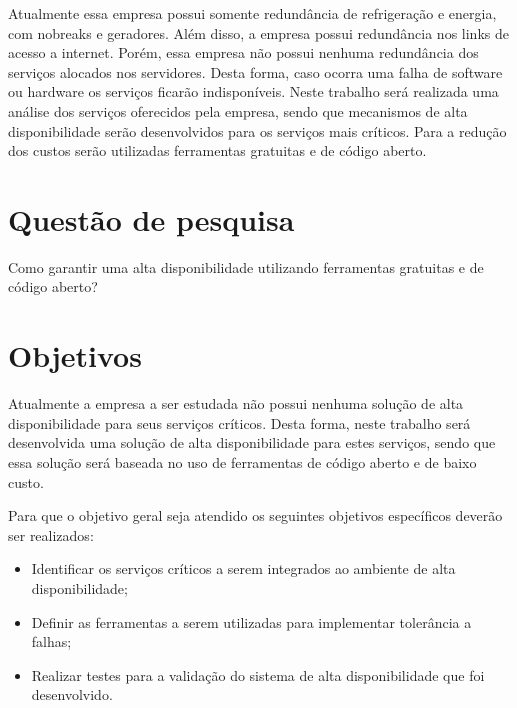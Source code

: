 Atualmente essa empresa possui somente redundância de refrigeração e energia, com nobreaks e geradores. Além disso, a empresa possui redundância nos links de acesso a internet. Porém, essa empresa não possui nenhuma redundância dos serviços alocados nos servidores. Desta forma, caso ocorra uma falha de software ou hardware os serviços ficarão indisponíveis. Neste trabalho será realizada uma análise dos serviços oferecidos pela empresa, sendo que mecanismos de alta disponibilidade serão desenvolvidos para os serviços mais críticos. Para a redução dos custos serão utilizadas ferramentas gratuitas e de código aberto.

\section{Questão de pesquisa}
Como garantir uma alta disponibilidade utilizando ferramentas gratuitas e de código aberto?

\section{Objetivos}
Atualmente a empresa a ser estudada não possui nenhuma solução de alta disponibilidade para seus serviços críticos. Desta forma, neste trabalho será desenvolvida uma solução de alta disponibilidade para estes serviços, sendo que essa solução será baseada no uso de ferramentas de código aberto e de baixo custo.

Para que o objetivo geral seja atendido os seguintes objetivos específicos deverão ser realizados:

\begin{itemize}
\item Identificar os serviços críticos a serem integrados ao ambiente de alta disponibilidade;
\item Definir as ferramentas a serem utilizadas para implementar tolerância a falhas;
\item Realizar testes para a validação do sistema de alta disponibilidade que foi desenvolvido.
\end{itemize}
